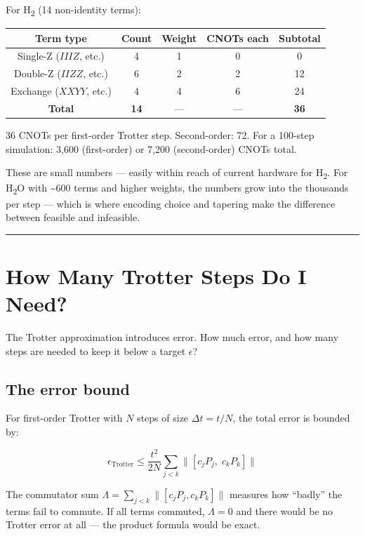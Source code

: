 \documentclass[
  11pt,
  oneside]{book}
\begin{document}
For H\textsubscript{2} (14 non-identity terms):

\begin{longtable}[]{@{}ccccc@{}}
\toprule\noalign{}
Term type & Count & Weight & CNOTs each & Subtotal \\
\midrule\noalign{}
\endhead
\bottomrule\noalign{}
\endlastfoot
Single-Z (\(IIIZ\), etc.) & 4 & 1 & 0 & 0 \\
Double-Z (\(IIZZ\), etc.) & 6 & 2 & 2 & 12 \\
Exchange (\(XXYY\), etc.) & 4 & 4 & 6 & 24 \\
\textbf{Total} & \textbf{14} & --- & --- & \textbf{36} \\
\end{longtable}

36 CNOTs per first-order Trotter step. Second-order: 72. For a 100-step
simulation: 3,600 (first-order) or 7,200 (second-order) CNOTs total.

These are small numbers --- easily within reach of current hardware for
H\textsubscript{2}. For H\textsubscript{2}O with \textasciitilde600 terms and higher weights, the
numbers grow into the thousands per step --- which is where encoding
choice and tapering make the difference between feasible and infeasible.

\begin{center}\rule{0.5\linewidth}{0.5pt}\end{center}

\section{How Many Trotter Steps Do I
Need?}\label{how-many-trotter-steps-do-i-need}

The Trotter approximation introduces error. How much error, and how many
steps are needed to keep it below a target \(\epsilon\)?

\subsection{The error bound}\label{the-error-bound}

For first-order Trotter with \(N\) steps of size \(\Delta t = t/N\), the
total error is bounded by:

\[\epsilon_\text{Trotter} \leq \frac{t^2}{2N} \sum_{j < k} \lVert [c_j P_j,\; c_k P_k] \rVert\]

The commutator sum
\(\Lambda = \sum_{j<k} \lVert [c_j P_j, c_k P_k] \rVert\) measures how
``badly'' the terms fail to commute. If all terms commuted,
\(\Lambda = 0\) and there would be no Trotter error at all --- the
product formula would be exact.
\end{document}
